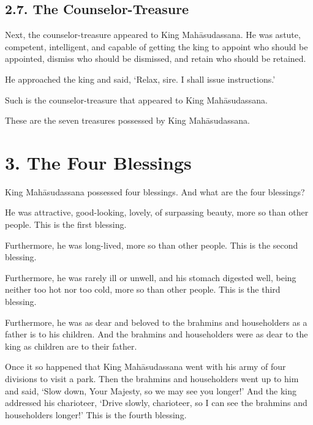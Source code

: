 \documentclass[12pt,openany]{book}%
\begin{document}
\subsection*{2.7. The Counselor-Treasure }

Next, the counselor-treasure appeared to King \textsanskrit{Mahāsudassana}. He was astute, competent, intelligent, and capable of getting the king to appoint who should be appointed, dismiss who should be dismissed, and retain who should be retained. 

He approached the king and said, ‘Relax, sire. I shall issue instructions.’ 

Such is the counselor-treasure that appeared to King \textsanskrit{Mahāsudassana}. 

These are the seven treasures possessed by King \textsanskrit{Mahāsudassana}. 

\section*{3. The Four Blessings }

King \textsanskrit{Mahāsudassana} possessed four blessings. And what are the four blessings? 

He was attractive, good-looking, lovely, of surpassing beauty, more so than other people. This is the first blessing. 

Furthermore, he was long-lived, more so than other people. This is the second blessing. 

Furthermore, he was rarely ill or unwell, and his stomach digested well, being neither too hot nor too cold, more so than other people. This is the third blessing. 

Furthermore, he was as dear and beloved to the brahmins and householders as a father is to his children. And the brahmins and householders were as dear to the king as children are to their father. 

Once it so happened that King \textsanskrit{Mahāsudassana} went with his army of four divisions to visit a park. Then the brahmins and householders went up to him and said, ‘Slow down, Your Majesty, so we may see you longer!’ And the king addressed his charioteer, ‘Drive slowly, charioteer, so I can see the brahmins and householders longer!’ This is the fourth blessing. 
\end{document}
